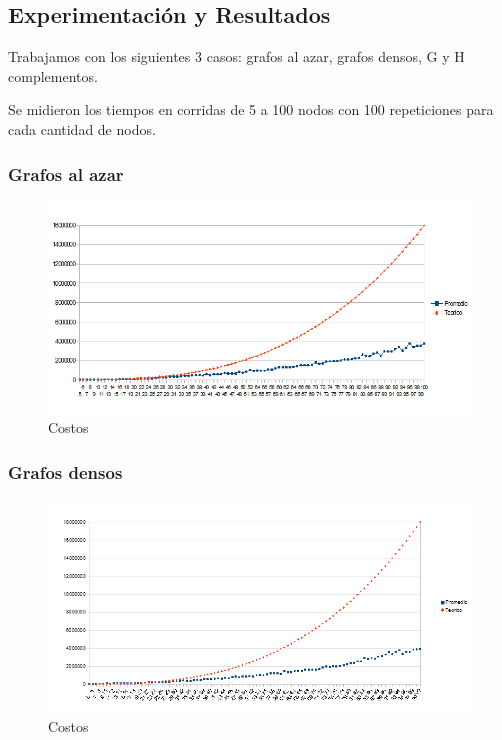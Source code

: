 \subsection{Experimentación y Resultados}
\quad Trabajamos con los siguientes 3 casos: grafos al azar, grafos densos, G y H complementos.

\quad Se midieron los tiempos en corridas de  5 a 100 nodos con 100 repeticiones para cada cantidad de nodos.

\subsubsection{Grafos al azar}

\begin{figure}[H]
	\centering
	\includegraphics[scale=0.8]{goloso-tiempos-Azar.png}
\caption{Costos}
\end{figure}

\subsubsection{Grafos densos}

\begin{figure}[H]
	\centering
	\includegraphics[scale=0.8]{goloso-tiempos-G-y-H-densos.png}
\caption{Costos}
\end{figure}

